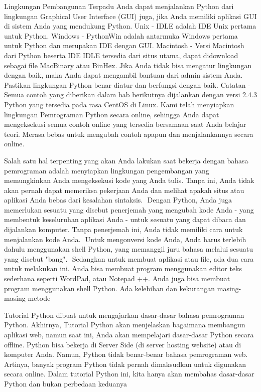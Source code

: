 {\fontsize{14pt}{14pt}\selectfont \vspace{\baselineskip}
Lingkungan Pembangunan Terpadu Anda dapat menjalankan Python dari lingkungan Graphical User Interface (GUI) juga, jika Anda memiliki aplikasi GUI di sistem Anda yang mendukung Python. Unix - IDLE adalah IDE Unix pertama untuk Python. Windows - PythonWin adalah antarmuka Windows pertama untuk Python dan merupakan IDE dengan GUI. Macintosh - Versi Macintosh dari Python beserta IDE IDLE tersedia dari situs utama, dapat didownload sebagai file MacBinary atau BinHex. Jika Anda tidak bisa mengatur lingkungan dengan baik, maka Anda dapat mengambil bantuan dari admin sistem Anda. Pastikan lingkungan Python benar diatur dan berfungsi dengan baik. Catatan - Semua contoh yang diberikan dalam bab berikutnya dijalankan dengan versi 2.4.3 Python yang tersedia pada rasa CentOS di Linux. Kami telah menyiapkan lingkungan Pemrograman Python secara online, sehingga Anda dapat mengeksekusi semua contoh online yang tersedia bersamaan saat Anda belajar teori. Merasa bebas untuk mengubah contoh apapun dan menjalankannya secara online. \\} \par
\vspace{14pt}
\noindent 
{\fontsize{14pt}{14pt}\selectfont \vspace{\baselineskip}
Salah satu hal terpenting yang akan Anda lakukan saat bekerja dengan bahasa pemrograman adalah menyiapkan lingkungan pengembangan yang memungkinkan Anda mengeksekusi kode yang Anda tulis. Tanpa ini, Anda tidak akan pernah dapat memeriksa pekerjaan Anda dan melihat apakah situs atau aplikasi Anda bebas dari kesalahan sintaksis.  $  $ Dengan Python, Anda juga memerlukan sesuatu yang disebut penerjemah yang mengubah kode Anda - yang membentuk keseluruhan aplikasi Anda - untuk sesuatu yang dapat dibaca dan dijalankan komputer. Tanpa penerjemah ini, Anda tidak memiliki cara untuk menjalankan kode Anda.  $  $ Untuk mengonversi kode Anda, Anda harus terlebih dahulu menggunakan shell Python, yang memanggil juru bahasa melalui sesuatu yang disebut "bang".  $  $ Sedangkan untuk membuat aplikasi atau file, ada dua cara untuk melakukan ini. Anda bisa membuat program menggunakan editor teks sederhana seperti WordPad, atau Notepad ++. Anda juga bisa membuat program menggunakan shell Python. Ada kelebihan dan kekurangan masing-masing metode \\} \par
\vspace{14pt}
\noindent 
{\fontsize{14pt}{14pt}\selectfont Tutorial Python dibuat untuk mengajarkan dasar-dasar bahasa pemrograman Python. Akhirnya, Tutorial Python akan menjelaskan bagaimana membangun aplikasi web, namun saat ini, Anda akan mempelajari dasar-dasar Python secara offline. Python bisa bekerja di Server Side (di server hosting website) atau di komputer Anda. Namun, Python tidak benar-benar bahasa pemrograman web. Artinya, banyak program Python tidak pernah dimaksudkan untuk digunakan secara online. Dalam tutorial Python ini, kita hanya akan membahas dasar-dasar Python dan bukan perbedaan keduanya \\} \par
